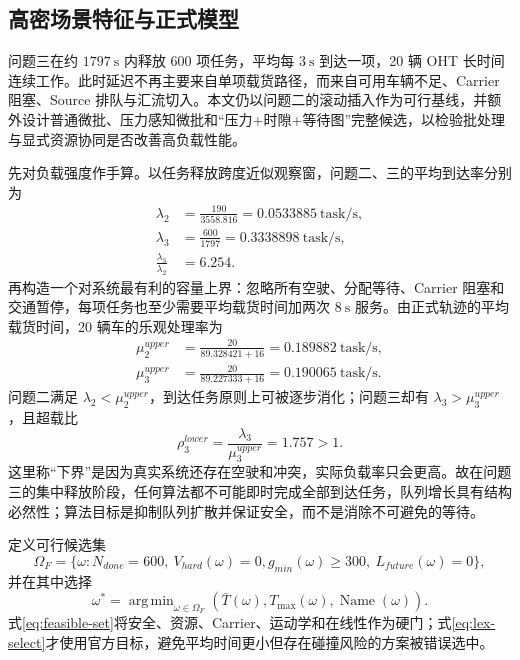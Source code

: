 \documentclass[UTF8]{ctexart}
\newcommand{\argmin}{\mathop{\mathrm{arg\,min}}}
\begin{document}
\subsection{高密场景特征与正式模型}

问题三在约 $1797\ \mathrm{s}$ 内释放 600 项任务，平均每 $3\ \mathrm{s}$ 到达一项，20 辆 OHT 长时间连续工作。此时延迟不再主要来自单项载货路径，而来自可用车辆不足、Carrier 阻塞、Source 排队与汇流切入。本文仍以问题二的滚动插入作为可行基线，并额外设计普通微批、压力感知微批和“压力+时隙+等待图”完整候选，以检验批处理与显式资源协同是否改善高负载性能。

先对负载强度作手算。以任务释放跨度近似观察窗，问题二、三的平均到达率分别为
\begin{align}
\lambda_2&=\frac{190}{3558.816}=0.0533885\ \mathrm{task/s},\\
\lambda_3&=\frac{600}{1797}=0.3338898\ \mathrm{task/s},\\
\frac{\lambda_3}{\lambda_2}&=6.254.
\end{align}
再构造一个对系统最有利的容量上界：忽略所有空驶、分配等待、Carrier 阻塞和交通暂停，每项任务也至少需要平均载货时间加两次 $8\ \mathrm{s}$ 服务。由正式轨迹的平均载货时间，20 辆车的乐观处理率为
\begin{align}
\mu_2^{upper}&=\frac{20}{89.328421+16}=0.189882\ \mathrm{task/s},\\
\mu_3^{upper}&=\frac{20}{89.227333+16}=0.190065\ \mathrm{task/s}.
\end{align}
问题二满足 $\lambda_2<\mu_2^{upper}$，到达任务原则上可被逐步消化；问题三却有 $\lambda_3>\mu_3^{upper}$，且超载比
\begin{equation}\label{eq:overload-ratio}
\rho_3^{lower}=\frac{\lambda_3}{\mu_3^{upper}}=1.757>1.
\end{equation}
这里称“下界”是因为真实系统还存在空驶和冲突，实际负载率只会更高。故在问题三的集中释放阶段，任何算法都不可能即时完成全部到达任务，队列增长具有结构必然性；算法目标是抑制队列扩散并保证安全，而不是消除不可避免的等待。

定义可行候选集
\begin{equation}\label{eq:feasible-set}
\Omega_F=\{\omega:N_{done}=600,\ V_{hard}(\omega)=0,
g_{min}(\omega)\ge300,\ L_{future}(\omega)=0\},
\end{equation}
并在其中选择
\begin{equation}\label{eq:lex-select}
\omega^*=\argmin_{\omega\in\Omega_F}
\left(\bar T(\omega),T_{\max}(\omega),\operatorname{Name}(\omega)\right).
\end{equation}
式\eqref{eq:feasible-set}将安全、资源、Carrier、运动学和在线性作为硬门；式\eqref{eq:lex-select}才使用官方目标，避免平均时间更小但存在碰撞风险的方案被错误选中。
\end{document}
